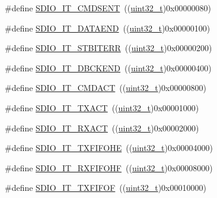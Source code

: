 \begin{DoxyCompactItemize}
\item 
\#define \hyperlink{group___s_d_i_o___interrupt__sources_gaf9d8fc4651c4b7555fb9ee4e5af6ca63}{S\+D\+I\+O\+\_\+\+I\+T\+\_\+\+C\+M\+D\+S\+E\+NT}~((\hyperlink{_p_e___types_8h_a33594304e786b158f3fb30289278f5af}{uint32\+\_\+t})0x00000080)
\item 
\#define \hyperlink{group___s_d_i_o___interrupt__sources_ga6cc1c521b64fc57b844336f7f175dd1e}{S\+D\+I\+O\+\_\+\+I\+T\+\_\+\+D\+A\+T\+A\+E\+ND}~((\hyperlink{_p_e___types_8h_a33594304e786b158f3fb30289278f5af}{uint32\+\_\+t})0x00000100)
\item 
\#define \hyperlink{group___s_d_i_o___interrupt__sources_ga55f7e65ed1b70d5a6abdc3cc41b55766}{S\+D\+I\+O\+\_\+\+I\+T\+\_\+\+S\+T\+B\+I\+T\+E\+RR}~((\hyperlink{_p_e___types_8h_a33594304e786b158f3fb30289278f5af}{uint32\+\_\+t})0x00000200)
\item 
\#define \hyperlink{group___s_d_i_o___interrupt__sources_gaa1b1fb453a3ce3b10928aaeada2b2186}{S\+D\+I\+O\+\_\+\+I\+T\+\_\+\+D\+B\+C\+K\+E\+ND}~((\hyperlink{_p_e___types_8h_a33594304e786b158f3fb30289278f5af}{uint32\+\_\+t})0x00000400)
\item 
\#define \hyperlink{group___s_d_i_o___interrupt__sources_gae73ae9bc72eaeedc2a37221697bc33e2}{S\+D\+I\+O\+\_\+\+I\+T\+\_\+\+C\+M\+D\+A\+CT}~((\hyperlink{_p_e___types_8h_a33594304e786b158f3fb30289278f5af}{uint32\+\_\+t})0x00000800)
\item 
\#define \hyperlink{group___s_d_i_o___interrupt__sources_ga811e683588ab887abb0101defafdb51e}{S\+D\+I\+O\+\_\+\+I\+T\+\_\+\+T\+X\+A\+CT}~((\hyperlink{_p_e___types_8h_a33594304e786b158f3fb30289278f5af}{uint32\+\_\+t})0x00001000)
\item 
\#define \hyperlink{group___s_d_i_o___interrupt__sources_ga1d9a59a2415b57bdf9827423cb6ce3a0}{S\+D\+I\+O\+\_\+\+I\+T\+\_\+\+R\+X\+A\+CT}~((\hyperlink{_p_e___types_8h_a33594304e786b158f3fb30289278f5af}{uint32\+\_\+t})0x00002000)
\item 
\#define \hyperlink{group___s_d_i_o___interrupt__sources_gaf538ae7dd73d55e76069e8710858038a}{S\+D\+I\+O\+\_\+\+I\+T\+\_\+\+T\+X\+F\+I\+F\+O\+HE}~((\hyperlink{_p_e___types_8h_a33594304e786b158f3fb30289278f5af}{uint32\+\_\+t})0x00004000)
\item 
\#define \hyperlink{group___s_d_i_o___interrupt__sources_gadcbc1a0de8b9df83b5c6c839b4739c87}{S\+D\+I\+O\+\_\+\+I\+T\+\_\+\+R\+X\+F\+I\+F\+O\+HF}~((\hyperlink{_p_e___types_8h_a33594304e786b158f3fb30289278f5af}{uint32\+\_\+t})0x00008000)
\item 
\#define \hyperlink{group___s_d_i_o___interrupt__sources_ga3ec471bd9233561d6e929ebac6362b75}{S\+D\+I\+O\+\_\+\+I\+T\+\_\+\+T\+X\+F\+I\+F\+OF}~((\hyperlink{_p_e___types_8h_a33594304e786b158f3fb30289278f5af}{uint32\+\_\+t})0x00010000)

\end{DoxyCompactItemize}
